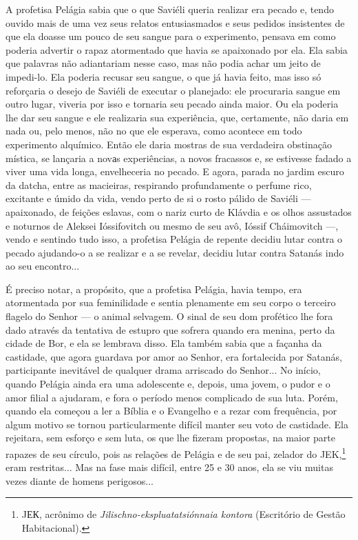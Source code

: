 A profetisa Pelágia sabia que o que Saviéli queria realizar era pecado
e, tendo ouvido mais de uma vez seus relatos entusiasmados e seus
pedidos insistentes de que ela doasse um pouco de seu sangue para o
experimento, pensava em como poderia advertir o rapaz atormentado que
havia se apaixonado por ela. Ela sabia que palavras não adiantariam
nesse caso, mas não podia achar um jeito de impedi-lo. Ela poderia
recusar seu sangue, o que já havia feito, mas isso só reforçaria o
desejo de Saviéli de executar o planejado: ele procuraria sangue em
outro lugar, viveria por isso e tornaria seu pecado ainda maior. Ou ela
poderia lhe dar seu sangue e ele realizaria sua experiência, que,
certamente, não daria em nada ou, pelo menos, não no que ele esperava,
como acontece em todo experimento alquímico. Então ele daria mostras de
sua verdadeira obstinação mística, se lançaria a novаs experiências, a
novos fracassos e, se estivesse fadado a viver uma vida longa,
envelheceria no pecado. E agora, parada no jardim escuro da datcha,
entre as macieiras, respirando profundamente o perfume rico, excitante e
úmido da vida, vendo perto de si o rosto pálido de Saviéli ---
apaixonado, de feições eslavas, com o nariz curto de Klávdia e os olhos
assustados e noturnos de Aleksei Ióssifovitch ou mesmo de seu avô,
Ióssif Cháimovitch ---, vendo e sentindo tudo isso, a profetisa Pelágia
de repente decidiu lutar contra o pecado ajudando-o a se realizar e a se
revelar, decidiu lutar contra Satanás indo ao seu encontro...

É preciso notar, a propósito, que a profetisa Pelágia, havia tempo, era
atormentada por sua feminilidade e sentia plenamente em seu corpo o
terceiro flagelo do Senhor --- o animal selvagem. O sinal de seu dom
profético lhe fora dado através da tentativa de estupro que sofrera
quando era menina, perto da cidade de Bor, e ela se lembrava disso. Ela
também sabia que a façanha da castidade, que agora guardava por amor ao
Senhor, era fortalecida por Satanás, participante inevitável de qualquer
drama arriscado do Senhor... No início, quando Pelágia ainda era uma
adolescente e, depois, uma jovem, o pudor e o amor filial a ajudaram, e
fora o período menos complicado de sua luta. Porém, quando ela começou a
ler a Bíblia e o Evangelho e a rezar com frequência, por algum motivo se
tornou particularmente difícil manter seu voto de castidade. Ela
rejeitara, sem esforço e sem luta, os que lhe fizeram propostas, na
maior parte rapazes de seu círculo, pois as relações de Pelágia e de seu
pai, zelador do JEK,\footnote{JЕК, acrônimo de
  \emph{Jilischno-ekspluatatsiónnaia kontora} (Escritório de Gestão
  Habitacional).} eram restritas... Mas na fase mais difícil, entre 25 e
30 anos, ela se viu muitas vezes diante de homens perigosos...

